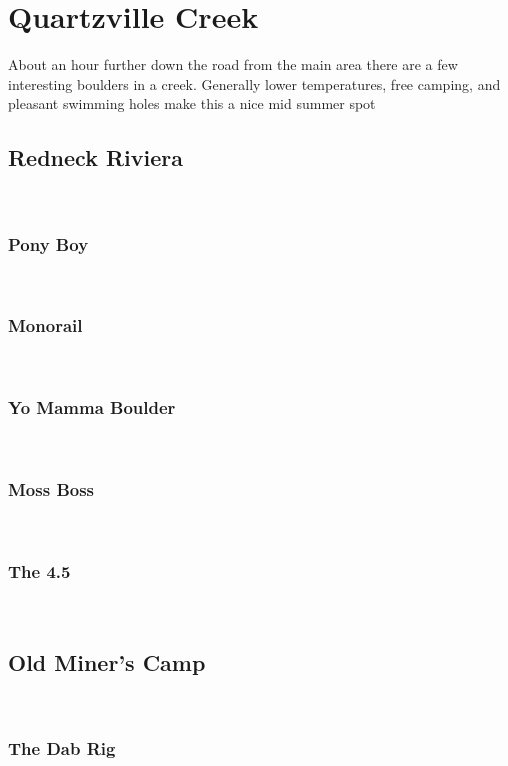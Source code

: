 \chapter{Quartzville Creek}\label{a:Quartzville Creek}
\lhead{\textcolor{\chapterColor}{\rule[-2pt]{\textwidth}{15pt}}}
About an hour further down the road from the main area there are a few interesting boulders in a creek. Generally lower temperatures, free camping, and pleasant swimming holes make this a nice mid summer spot

\section{Redneck Riviera}\label{sa:Redneck Riviera}
\

\subsection*{Pony Boy}\label{bf:Pony Boy}
\

\subsection*{Monorail}\label{bf:Monorail}
\

\subsection*{Yo Mamma Boulder}\label{bf:Yo Mamma Boulder}
\

\subsection*{Moss Boss}\label{bf:Moss Boss}
\

\subsection*{The 4.5}\label{bf:The 4.5}
\

\section{Old Miner's Camp}\label{sa:Old Miner's Camp}
\

\subsection*{The Dab Rig}\label{bf:The Dab Rig}
\

\clearpage